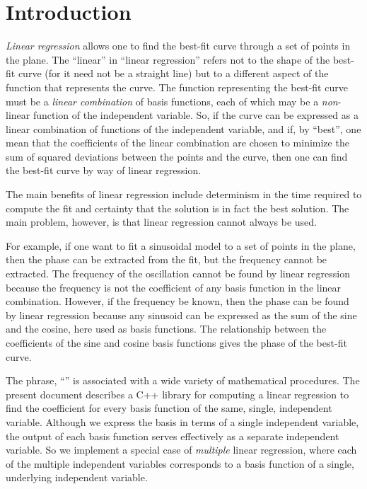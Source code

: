 \documentclass[twocolumn]{article}
\begin{document}
\thispagestyle{fancy}

%
%

\section{Introduction}

\emph{Linear regression} allows one to find the best-fit curve through a set of
points in the plane. The ``linear'' in ``linear regression'' refers not to the
shape of the best-fit curve (for it need not be a straight line) but to a
different aspect of the function that represents the curve. The function
representing the best-fit curve must be a \emph{linear combination} of basis
functions, each of which may be a \emph{non}-linear function of the independent
variable.  So, if the curve can be expressed as a linear combination of
functions of the independent variable, and if, by ``best'', one mean that the
coefficients of the linear combination are chosen to minimize the sum of
squared deviations between the points and the curve, then one can find the
best-fit curve by way of linear regression.

The main benefits of linear regression include determinism in the time required
to compute the fit and certainty that the solution is in fact the best
solution. The main problem, however, is that linear regression cannot always be
used.

For example, if one want to fit a sinusoidal model to a set of points in the
plane, then the phase can be extracted from the fit, but the frequency cannot
be extracted. The frequency of the oscillation cannot be found by linear
regression because the frequency is not the coefficient of any basis function
in the linear combination.  However, if the frequency be known, then the phase
can be found by linear regression because any sinusoid can be expressed as the
sum of the sine and the cosine, here used as basis functions. The relationship
between the coefficients of the sine and cosine basis functions gives the phase
of the best-fit curve.

The phrase, ``'' is associated
with a wide variety of mathematical procedures. The present document describes
a C++ library for computing a linear regression to find the coefficient for
every basis function of the same, single, independent variable.  Although we
express the basis in terms of a single independent variable, the output of each
basis function serves effectively as a separate independent variable.  So we
implement a special case of \emph{multiple} linear regression, where each of
the multiple independent variables corresponds to a basis function of a single,
underlying independent variable.
\end{document}
